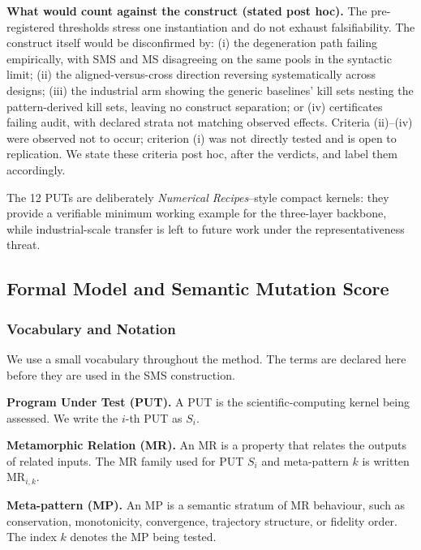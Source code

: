 \documentclass[manuscript,screen,review]{acmart}
\begin{document}
\textbf{What would count against the construct (stated post hoc).} The
pre-registered thresholds stress one instantiation and do not exhaust
falsifiability. The construct itself would be disconfirmed by: (i) the
degeneration path failing empirically, with SMS and MS disagreeing on
the same pools in the syntactic limit; (ii) the aligned-versus-cross
direction reversing systematically across designs; (iii) the industrial
arm showing the generic baselines' kill sets nesting the pattern-derived
kill sets, leaving no construct separation; or (iv) certificates failing
audit, with declared strata not matching observed effects. Criteria
(ii)--(iv) were observed not to occur; criterion (i) was not directly
tested and is open to replication. We state these criteria post hoc,
after the verdicts, and label them accordingly.

The 12 PUTs are deliberately \emph{Numerical Recipes}--style compact
kernels: they provide a verifiable minimum working example for the
three-layer backbone, while industrial-scale transfer is left to future
work under the representativeness threat.


\subsection{Formal Model and Semantic Mutation Score}\label{notation-and-equivalence-judgement}

\subsubsection{Vocabulary and Notation}\label{vocabulary-inheritance}

We use a small vocabulary throughout the method. The terms are declared
here before they are used in the SMS construction.

\textbf{Program Under Test (PUT).} A PUT is the scientific-computing
kernel being assessed. We write the \(i\)-th PUT as \(S_i\).

\textbf{Metamorphic Relation (MR).} An MR is a property that relates the
outputs of related inputs. The MR family used for PUT \(S_i\) and
meta-pattern \(k\) is written \(\mathrm{MR}_{i,k}\).

\textbf{Meta-pattern (MP).} An MP is a semantic stratum of MR behaviour,
such as conservation, monotonicity, convergence, trajectory structure, or
fidelity order. The index \(k\) denotes the MP being tested.
\end{document}
